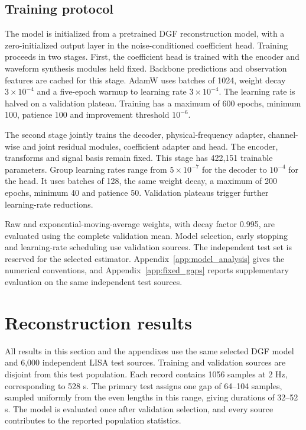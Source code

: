 \documentclass[10pt,prd,aps,a4paper,twocolumn,superscriptaddress,nofootinbib,floatfix]{revtex4-2}
\begin{document}
\subsection{Training protocol}\label{sec:training}
The model is initialized from a pretrained DGF reconstruction model, with a zero-initialized output layer in the noise-conditioned coefficient head. Training proceeds in two stages. First, the coefficient head is trained with the encoder and waveform synthesis modules held fixed. Backbone predictions and observation features are cached for this stage. AdamW uses batches of 1024, weight decay $3\times10^{-4}$ and a five-epoch warmup to learning rate $3\times10^{-4}$. The learning rate is halved on a validation plateau. Training has a maximum of 600 epochs, minimum 100, patience 100 and improvement threshold $10^{-6}$.

The second stage jointly trains the decoder, physical-frequency adapter, channel-wise and joint residual modules, coefficient adapter and head. The encoder, transforms and signal basis remain fixed. This stage has 422,151 trainable parameters. Group learning rates range from $5\times10^{-7}$ for the decoder to $10^{-4}$ for the head. It uses batches of 128, the same weight decay, a maximum of 200 epochs, minimum 40 and patience 50. Validation plateaus trigger further learning-rate reductions.

Raw and exponential-moving-average weights, with decay factor 0.995, are evaluated using the complete validation mean. Model selection, early stopping and learning-rate scheduling use validation sources. The independent test set is reserved for the selected estimator. Appendix~\ref{app:model_analysis} gives the numerical conventions, and Appendix~\ref{app:fixed_gaps} reports supplementary evaluation on the same independent test sources.

\section{Reconstruction results}\label{sec:results}
All results in this section and the appendixes use the same selected DGF model and 6,000 independent LISA test sources. Training and validation sources are disjoint from this test population. Each record contains 1056 samples at 2 Hz, corresponding to 528 s. The primary test assigns one gap of 64--104 samples, sampled uniformly from the even lengths in this range, giving durations of 32--52 s. The model is evaluated once after validation selection, and every source contributes to the reported population statistics.
\end{document}
